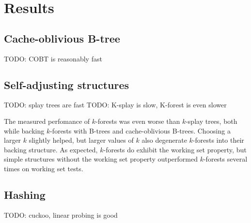 \chapter{Results}
\label{chapter:results}

\section{Cache-oblivious B-tree}
TODO: COBT is reasonably fast

\section{Self-adjusting structures}
TODO: splay trees are fast
TODO: K-splay is slow, K-forest is even slower

The measured perfomance of $k$-forests was even worse than $k$-splay trees,
both while backing $k$-forests with B-trees and cache-oblivious B-trees.
Choosing a larger $k$ slightly helped, but larger values of $k$ also degenerate
$k$-forests into their backing structure. As expected, $k$-forests do exhibit
the working set property, but simple structures without the working set property
outperformed $k$-forests several times on working set tests.

\section{Hashing}
TODO: cuckoo, linear probing is good
